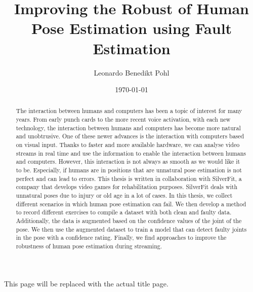 
\title{Improving the Robust of Human Pose Estimation using Fault Estimation}
\author{Leonardo Benedikt Pohl}

\date{\today}

This page will be replaced with the actual title page.

\clearpage

\begin{abstract}
    
  The interaction between humans and computers has been a topic of interest for many years. From early punch cards to the more recent voice activation, with each new technology, the interaction between humans and computers has become more natural and unobtrusive. One of these newer advances is the interaction with computers based on visual input. Thanks to faster and more available hardware, we can analyse video streams in real time and use the information to enable the interaction between humans and computers. However, this interaction is not always as smooth as we would like it to be. Especially, if humans are in positions that are unnatural pose estimation is not perfect and can lead to errors. This thesis is written in collaboration with SilverFit, a company that develops video games for rehabilitation purposes. SilverFit deals with unnatural poses due to injury or old age in a lot of cases. In this thesis, we collect different scenarios in which human pose estimation can fail. We then develop a method to record different exercises to compile a dataset with both clean and faulty data.  Additionally, the data is augmented based on the confidence values of the joint of the pose. We then use the augmented dataset to train a model that can detect faulty joints in the pose with a confidence rating. Finally, we find approaches to improve the robustness of human pose estimation during streaming.
  
\end{abstract}
